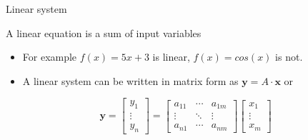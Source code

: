 \documentclass[compress]{beamer}
\begin{document}
\begin{frame}{Linear system}

A linear equation is a sum of input variables

\begin{itemize}
    \item   For example $f(x)=5x+3$ is linear, $f(x)=cos(x)$ is not.
    \item A linear system can be written in matrix form as $\mathbf{y}=A\cdot \mathbf{x}$ or
\end{itemize}

\[
\mathbf{y} = 
\begin{bmatrix}
    y_1 \\
    \vdots \\ 
    y_n
\end{bmatrix}
=
\begin{bmatrix}
    a_{11} & \cdots & a_{1m}\\ 
    \vdots & \ddots &  \vdots \\ 
    a_{n1} & \cdots & a_{nm}
\end{bmatrix}
\begin{bmatrix}
    x_1 \\
    \vdots \\ 
    x_m
\end{bmatrix}
\]

\end{frame}
\end{document}
